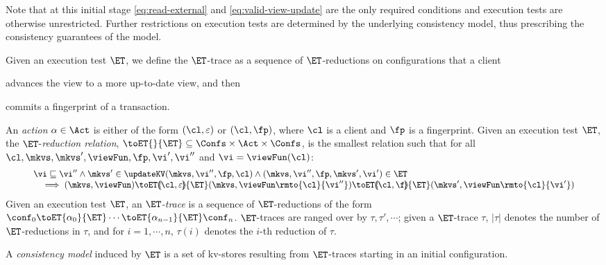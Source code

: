 Note that at this initial stage \eqref{eq:read-external} and \eqref{eq:valid-view-update} are the only required conditions and execution tests are otherwise unrestricted. 
Further restrictions on execution tests are determined by the underlying consistency model, thus prescribing the consistency guarantees of the model.

Given an execution test  $\ET$, we define the $\ET$-trace as a sequence of $\ET$-reductions on configurations that a client
\begin{enumerate*}
	\item advances the view to a more up-to-date view, and then
	\item commits a fingerprint of a transaction. 
\end{enumerate*}

\begin{definition}[$\ET$-trace]
\label{def:reduction}
An \emph{action} $\alpha \in \Act$ is either of the form $(\cl, \varepsilon)$ or $(\cl, \fp)$, 
where $\cl$ is a client and $\fp$ is a fingerprint. 
Given an execution test $\ET$, the $\ET$-\emph{reduction relation},
$\toET{}{\ET} \subseteq \Confs \times \Act \times \Confs$, 
is the smallest relation such that for all $\cl, \mkvs, \mkvs', \viewFun, \fp, \vi', \vi''$ and $\vi = \viewFun(\cl)$:
%
{
\[
\small
\begin{array}{@{}l@{}}
    \vi \sqsubseteq \vi'' 
    \land \mkvs' \in \updateKV(\mkvs, \vi'', \fp, \cl)
    \land (\mkvs, \vi'', \fp, \mkvs', \vi') \in \ET \\
    \quad \implies
    (\mkvs, \viewFun) \toET{\hspace{-5pt}(\cl, \varepsilon)\hspace{-5pt}}{\ET} 
    (\mkvs, \viewFun\rmto{\cl}{\vi''}) \toET{\hspace{-5pt}(\cl,\f)\hspace{-5pt}}{\ET} (\mkvs', \viewFun\rmto{\cl}{\vi'})
\end{array}
\]
}
%
Given an execution test $\ET$, an \emph{$\ET$-trace} is a sequence of $\ET$-reductions of the form $\conf_{0} \toET{\alpha_{0}}{\ET} \cdots \toET{\alpha_{n-1}}{\ET} \conf_{n}$. $\ET$-traces are ranged over by $\tau, \tau', \cdots$; 
given a $\ET$-trace $\tau$, $\lvert \tau \rvert$ denotes the number of $\ET$-reductions in $\tau$, and 
for $i=1,\cdots,n$, $\tau(i)$ denotes the $i$-th reduction of $\tau$.
\end{definition}

A \emph{consistency model} induced by $\ET$ is a set of kv-stores
resulting from $\ET$-traces starting in an 
initial configuration. 


